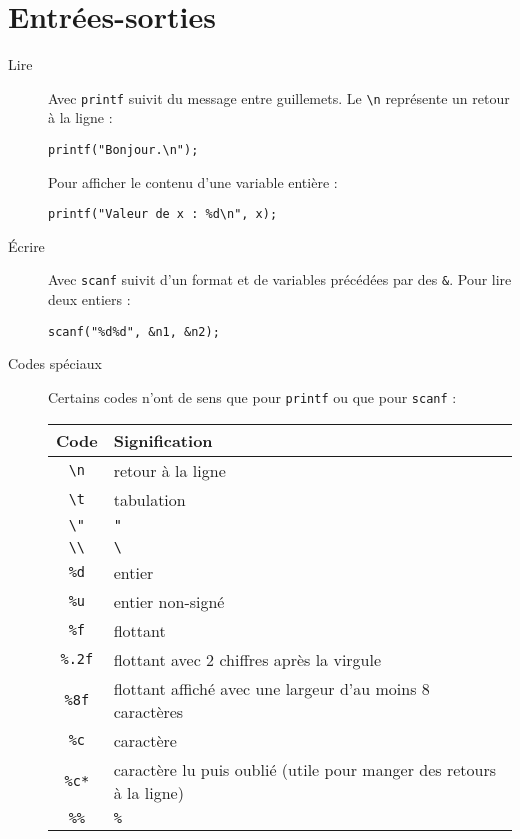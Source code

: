 \documentclass[a4paper,10pt]{article}
\begin{document}
  \section{Entrées-sorties}
  \begin{description}
    \item[Lire] Avec \texttt{printf} suivit du message entre guillemets. Le \texttt{\textbackslash n} représente un retour à la ligne :
      \begin{verbatim}
printf("Bonjour.\n");
      \end{verbatim}
      Pour afficher le contenu d'une variable entière :
      \begin{verbatim}
printf("Valeur de x : %d\n", x);
      \end{verbatim}
    \item[Écrire] Avec \texttt{scanf} suivit d'un format et de variables précédées par des \texttt{\&}. Pour lire deux entiers :
      \begin{verbatim}
scanf("%d%d", &n1, &n2);
      \end{verbatim}
    \item[Codes spéciaux] Certains codes n'ont de sens que pour \texttt{printf} ou que pour \texttt{scanf} :\\
      \begin{tabu}{c|l}
        Code & Signification\\
        \hline
        \texttt{\textbackslash n} & retour à la ligne\\
        \texttt{\textbackslash t} & tabulation\\
        \texttt{\textbackslash "} & \texttt{"}\\
        \texttt{\textbackslash \textbackslash} & \texttt{\textbackslash}\\
        \hline
        \texttt{\%d} & entier\\
        \texttt{\%u} & entier non-signé\\
        \texttt{\%f} & flottant\\
        \texttt{\%.2f} & flottant avec 2 chiffres après la virgule\\
        \texttt{\%8f} & flottant affiché avec une largeur d'au moins 8 caractères\\
        \texttt{\%c} & caractère\\
        \texttt{\%c*} & caractère lu puis oublié (utile pour manger des retours à la ligne)\\
        \texttt{\%\%} & \texttt{\%}\\
      \end{tabu}
  \end{description}
\end{document}
